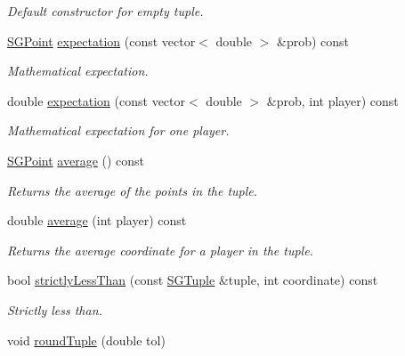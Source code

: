 \begin{DoxyCompactItemize}
\begin{DoxyCompactList}\small\item\em Default constructor for empty tuple. \end{DoxyCompactList}\item 
\hyperlink{class_s_g_point}{S\+G\+Point} \hyperlink{class_s_g_tuple_a95eb1d50e77aac6971fac366d9fdb73e}{expectation} (const vector$<$ double $>$ \&prob) const 
\begin{DoxyCompactList}\small\item\em Mathematical expectation. \end{DoxyCompactList}\item 
double \hyperlink{class_s_g_tuple_a73fcc6c4b904f9df9cf3e435dbaa8a44}{expectation} (const vector$<$ double $>$ \&prob, int player) const 
\begin{DoxyCompactList}\small\item\em Mathematical expectation for one player. \end{DoxyCompactList}\item 
\hypertarget{class_s_g_tuple_a56b33132903ed7ab3560fcd3ce583b59}{\hyperlink{class_s_g_point}{S\+G\+Point} \hyperlink{class_s_g_tuple_a56b33132903ed7ab3560fcd3ce583b59}{average} () const }\label{class_s_g_tuple_a56b33132903ed7ab3560fcd3ce583b59}

\begin{DoxyCompactList}\small\item\em Returns the average of the points in the tuple. \end{DoxyCompactList}\item 
\hypertarget{class_s_g_tuple_a0400cf2edf7f4a04c232540ad2e11fe1}{double \hyperlink{class_s_g_tuple_a0400cf2edf7f4a04c232540ad2e11fe1}{average} (int player) const }\label{class_s_g_tuple_a0400cf2edf7f4a04c232540ad2e11fe1}

\begin{DoxyCompactList}\small\item\em Returns the average coordinate for a player in the tuple. \end{DoxyCompactList}\item 
bool \hyperlink{class_s_g_tuple_a13c10cd325cb7b2c6b7a5fc55ea0d353}{strictly\+Less\+Than} (const \hyperlink{class_s_g_tuple}{S\+G\+Tuple} \&tuple, int coordinate) const 
\begin{DoxyCompactList}\small\item\em Strictly less than. \end{DoxyCompactList}\item 
\hypertarget{class_s_g_tuple_a348c27be7bd4c7fd42341814d30b9d3f}{void \hyperlink{class_s_g_tuple_a348c27be7bd4c7fd42341814d30b9d3f}{round\+Tuple} (double tol)}\label{class_s_g_tuple_a348c27be7bd4c7fd42341814d30b9d3f}


\end{DoxyCompactItemize}
